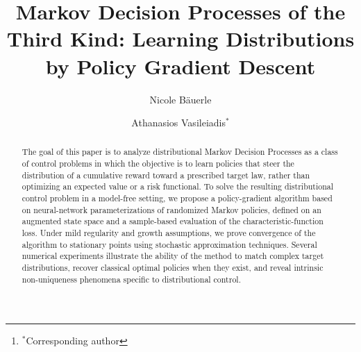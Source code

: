 \documentclass[reqno, 11pt]{amsart}%
\theoremstyle{definition}
\begin{document}
\title[MDP of the Third Kind]{Markov Decision Processes of the Third Kind: Learning Distributions by Policy Gradient Descent}

\author[N. \smash{B\"auerle}]{Nicole B\"auerle}
\address[N. B\"auerle]{Department of Mathematics,
Karlsruhe Institute of Technology (KIT), D-76128 Karlsruhe, Germany, \href{mailto:nicole.baeuerle@kit.edu}{nicole.baeuerle@kit.edu}}

\author[A. \smash{Vasileiadis}]{Athanasios Vasileiadis$^*$}
\address[A. Vasileiadis]{Department of Mathematics,
Karlsruhe Institute of Technology (KIT), D-76128 Karlsruhe, Germany, \href{mailto:nicole.baeuerle@kit.edu}{athanasios.vasileiadis@kit.edu}, \footnote{$^*$Corresponding author}}







\begin{abstract}%
The goal of this paper is to analyze distributional Markov Decision Processes as a class of control problems in which the objective is to learn policies that steer the distribution of a cumulative reward toward a prescribed target law, rather than optimizing an expected value or a risk functional. To solve the resulting distributional control problem in a model-free setting, we propose a policy-gradient algorithm based on neural-network parameterizations of randomized Markov policies, defined on an augmented state space and a sample-based evaluation of the characteristic-function loss. Under mild regularity and growth assumptions, we prove convergence of the algorithm to stationary points using stochastic approximation techniques. Several numerical experiments illustrate the ability of the method to match complex target distributions, recover classical optimal policies when they exist, and reveal intrinsic non-uniqueness phenomena specific to distributional control.
\end{abstract}
\end{document}

